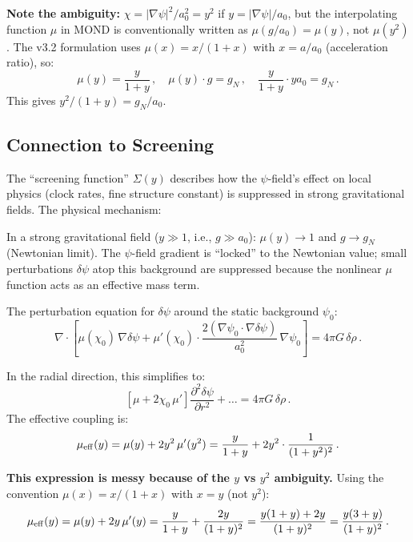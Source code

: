 \documentclass[11pt]{article}
\newcommand{\aM}{a_0}
\begin{document}
\textbf{Note the ambiguity:}  $\chi = |\nabla\psi|^2/\aM^2 = y^2$
if $y = |\nabla\psi|/\aM$, but the interpolating function $\mu$ in
MOND is conventionally written as $\mu(g/\aM) = \mu(y)$, not
$\mu(y^2)$.  The v3.2 formulation uses $\mu(x) = x/(1+x)$ with
$x = a/\aM$ (acceleration ratio), so:
\begin{equation}
\mu(y) = \frac{y}{1+y}\,,
\quad
\mu(y)\cdot g = g_N\,,
\quad
\frac{y}{1+y}\cdot y\aM = g_N\,.
\end{equation}
This gives $y^2/(1+y) = g_N/\aM$.

\subsection{Connection to Screening}

The ``screening function'' $\Sigma(y)$ describes how the $\psi$-field's
effect on local physics (clock rates, fine structure constant) is
suppressed in strong gravitational fields.  The physical mechanism:

In a strong gravitational field ($y \gg 1$, i.e., $g \gg \aM$):
$\mu(y) \to 1$ and $g \to g_N$ (Newtonian limit).  The $\psi$-field
gradient is ``locked'' to the Newtonian value; small perturbations
$\delta\psi$ atop this background are suppressed because the nonlinear
$\mu$ function acts as an effective mass term.

The perturbation equation for $\delta\psi$ around the static background
$\psi_0$:
\begin{equation}
\nabla\cdot\left[\mu(\chi_0)\,\nabla\delta\psi
+ \mu'(\chi_0)\cdot\frac{2(\nabla\psi_0\cdot\nabla\delta\psi)}{\aM^2}
\,\nabla\psi_0\right] = 4\pi G\,\delta\rho\,.
\end{equation}

In the radial direction, this simplifies to:
\begin{equation}
\left[\mu + 2\chi_0\,\mu'\right]\frac{\partial^2\delta\psi}{\partial r^2}
+ \ldots = 4\pi G\,\delta\rho\,.
\end{equation}
The effective coupling is:
\begin{equation}
\mu_{\rm eff}(y) = \mu(y) + 2y^2\,\mu'(y^2)
= \frac{y}{1+y} + 2y^2\cdot\frac{1}{(1+y^2)^2}\,.
\end{equation}

\textbf{This expression is messy because of the $y$ vs $y^2$
ambiguity.}  Using the convention $\mu(x) = x/(1+x)$ with $x = y$
(not $y^2$):
\begin{equation}
\mu_{\rm eff}(y) = \mu(y) + 2y\,\mu'(y)
= \frac{y}{1+y} + \frac{2y}{(1+y)^2}
= \frac{y(1+y) + 2y}{(1+y)^2}
= \frac{y(3+y)}{(1+y)^2}\,.
\end{equation}
\end{document}
